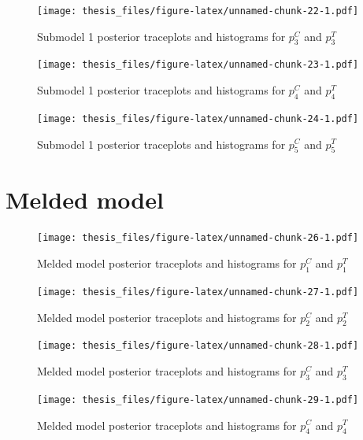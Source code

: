 \documentclass[11pt,]{book}
\begin{document}
\begin{figure}
\centering
\texttt{[image: thesis\_files/figure-latex/unnamed-chunk-22-1.pdf]}
\caption{\label{fig:unnamed-chunk-22}Submodel 1 posterior traceplots and
histograms for \(p_3^C\) and \(p_3^T\)}
\end{figure}

\begin{figure}
\centering
\texttt{[image: thesis\_files/figure-latex/unnamed-chunk-23-1.pdf]}
\caption{\label{fig:unnamed-chunk-23}Submodel 1 posterior traceplots and
histograms for \(p_4^C\) and \(p_4^T\)}
\end{figure}

\begin{figure}
\centering
\texttt{[image: thesis\_files/figure-latex/unnamed-chunk-24-1.pdf]}
\caption{\label{fig:unnamed-chunk-24}Submodel 1 posterior traceplots and
histograms for \(p_5^C\) and \(p_5^T\)}
\end{figure}

\newpage

\section{Melded model}\label{melded-model}

\begin{figure}
\centering
\texttt{[image: thesis\_files/figure-latex/unnamed-chunk-26-1.pdf]}
\caption{\label{fig:unnamed-chunk-26}Melded model posterior traceplots and
histograms for \(p_1^C\) and \(p_1^T\)}
\end{figure}

\begin{figure}
\centering
\texttt{[image: thesis\_files/figure-latex/unnamed-chunk-27-1.pdf]}
\caption{\label{fig:unnamed-chunk-27}Melded model posterior traceplots and
histograms for \(p_2^C\) and \(p_2^T\)}
\end{figure}

\begin{figure}
\centering
\texttt{[image: thesis\_files/figure-latex/unnamed-chunk-28-1.pdf]}
\caption{\label{fig:unnamed-chunk-28}Melded model posterior traceplots and
histograms for \(p_3^C\) and \(p_3^T\)}
\end{figure}

\begin{figure}
\centering
\texttt{[image: thesis\_files/figure-latex/unnamed-chunk-29-1.pdf]}
\caption{\label{fig:unnamed-chunk-29}Melded model posterior traceplots and
histograms for \(p_4^C\) and \(p_4^T\)}
\end{figure}
\end{document}
